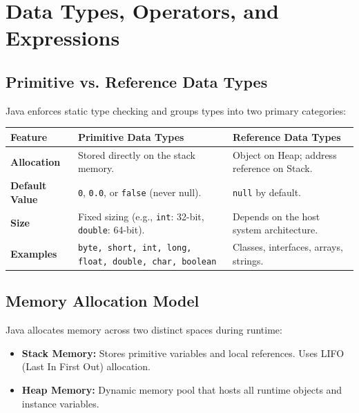 \documentclass[12pt,a4paper]{article}
\renewcommand{\arraystretch}{1.45}
\begin{document}
\section{Data Types, Operators, and Expressions}

\subsection{Primitive vs. Reference Data Types}
Java enforces static type checking and groups types into two primary categories:

\par\noindent
{\renewcommand{\arraystretch}{1.5}%
\begin{tabularx}{\linewidth}{|B{3.2cm}|Y|Y|}
\hline
\textbf{Feature} & \textbf{Primitive Data Types} & \textbf{Reference Data Types} \\
\hline
\textbf{Allocation} & Stored directly on the stack memory. & Object on Heap; address reference on Stack. \\
\hline
\textbf{Default Value} & \texttt{0}, \texttt{0.0}, or \texttt{false} (never null). & \texttt{null} by default. \\
\hline
\textbf{Size} & Fixed sizing (e.g., \texttt{int}: 32-bit, \texttt{double}: 64-bit). & Depends on the host system architecture. \\
\hline
\textbf{Examples} & \texttt{byte, short, int, long, float, double, char, boolean} & Classes, interfaces, arrays, strings. \\
\hline
\end{tabularx}}

\subsection{Memory Allocation Model}
Java allocates memory across two distinct spaces during runtime:
\begin{itemize}[leftmargin=*, itemsep=3pt]
  \item \textbf{Stack Memory:} Stores primitive variables and local references. Uses LIFO (Last In First Out) allocation.
  \item \textbf{Heap Memory:} Dynamic memory pool that hosts all runtime objects and instance variables.
\end{itemize}
\end{document}

